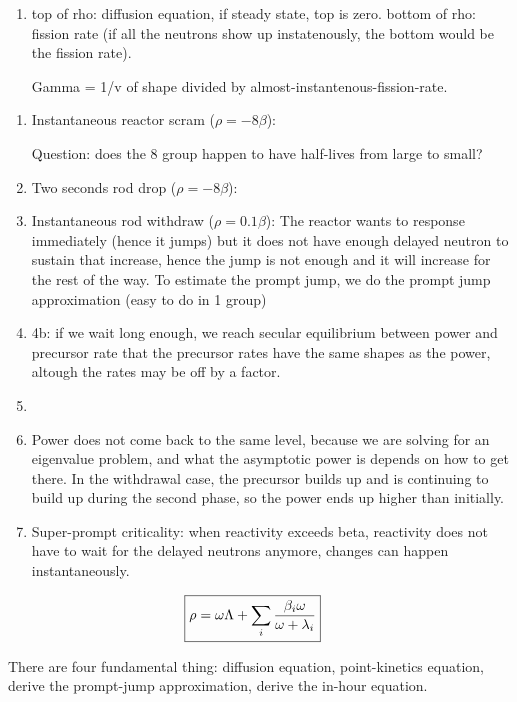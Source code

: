 \documentclass{school-22.211-notes}
\begin{document}
\begin{enumerate}
\item top of rho: diffusion equation, if steady state, top is zero. 
bottom of rho: fission rate (if all the neutrons show up instatenously, the bottom would be the fission rate). 

Gamma = 1/v of shape divided by almost-instantenous-fission-rate. 

\end{enumerate}

\clearpage
{}

\begin{enumerate}
\item Instantaneous reactor scram ($\rho = - 8 \beta$): 

Question: does the 8 group happen to have half-lives from large to small? 
\item Two seconds rod drop ($\rho = - 8 \beta$):

\item Instantaneous rod withdraw ($\rho = 0.1 \beta$): 
The reactor wants to response immediately (hence it jumps) but it does not have enough delayed neutron to sustain that increase, hence the jump is not enough and it will increase for the rest of the way. To estimate the prompt jump, we do the prompt jump approximation (easy to do in 1 group)

\item 4b: if we wait long enough, we reach secular equilibrium between power and precursor rate that the precursor rates have the same shapes as the power, altough the rates may be off by a factor. 

\item 

\item Power does not come back to the same level, because we are solving for an eigenvalue problem, and what the asymptotic power is depends on how to get there. In the withdrawal case, the precursor builds up and is continuing to build up during the second phase, so the power ends up higher than initially. 


\item Super-prompt criticality: when reactivity exceeds beta, reactivity does not have to wait for the delayed neutrons anymore, changes can happen instantaneously.  
\end{enumerate}



\clearpage
{}





\clearpage
{}



\begin{align}
\Aboxed{ \rho &= \omega \Lambda + \Sum_i \frac{\beta_i \omega}{\omega + \lambda_i}}
\end{align}


There are four fundamental thing: diffusion equation, point-kinetics equation, derive the prompt-jump approximation, derive the in-hour equation. 
\end{document}
